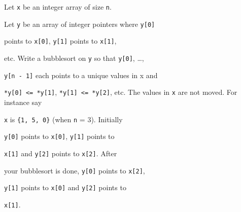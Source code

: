 Let \texttt{x} be an integer array of size \texttt{n}.

Let \texttt{y} be an array of integer pointers where \texttt{y[0]}

points to \texttt{x[0]}, \texttt{y[1]} points to \texttt{x[1]},

etc. Write a bubblesort on \texttt{y} so that \texttt{y[0]}, \ldots,

\texttt{y[n - 1]} each points to a unique values in x and

\texttt{*y[0] <= *y[1]}, \texttt{*y[1] <= *y[2]}, etc. The values in \texttt{x} are not moved. For instance say

\texttt{x} is \texttt{\{1, 5, 0\}} (when \texttt{n} = 3). Initially

\texttt{y[0]} points to \texttt{x[0]}, \texttt{y[1]} points to

\texttt{x[1]} and \texttt{y[2]} points to \texttt{x[2]}. After

your bubblesort is done, \texttt{y[0]} points to \texttt{x[2]},

\texttt{y[1]} points to \texttt{x[0]} and \texttt{y[2]} points to

\texttt{x[1]}.

